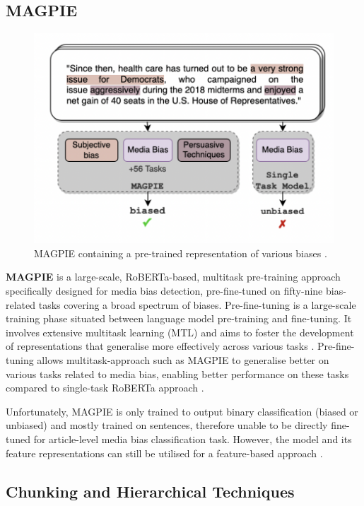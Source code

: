 \subsection{MAGPIE}

\begin{figure}[htbp]
    \centering
    \includegraphics[width=0.9\linewidth]{images/magpie.png}
    \caption{MAGPIE containing a pre-trained representation of various biases \cite{horych-2024-magpie}.}
    \label{fig:magpie}
\end{figure}

\textbf{MAGPIE} \cite{horych-2024-magpie} is a large-scale, RoBERTa-based, multitask pre-training approach specifically designed for media bias detection, pre-fine-tuned on fifty-nine bias-related tasks covering a broad spectrum of biases. Pre-fine-tuning is a large-scale training phase situated between language model pre-training and fine-tuning. It involves extensive multitask learning (MTL) \cite{caruana-1997-mtl} and aims to foster the development of representations that generalise more effectively across various tasks \cite{aghajanyan-2021-muppet}. Pre-fine-tuning allows multitask-approach such as MAGPIE to generalise better on various tasks related to media bias, enabling better performance on these tasks compared to single-task RoBERTa approach \cite{horych-2024-magpie}.

Unfortunately, MAGPIE is only trained to output binary classification (biased or unbiased) and mostly trained on sentences, therefore unable to be directly fine-tuned for article-level media bias classification task. However, the model and its feature representations can still be utilised for a feature-based approach \cite{devlin-2019-bert}.


\subsection{Chunking and Hierarchical Techniques}

